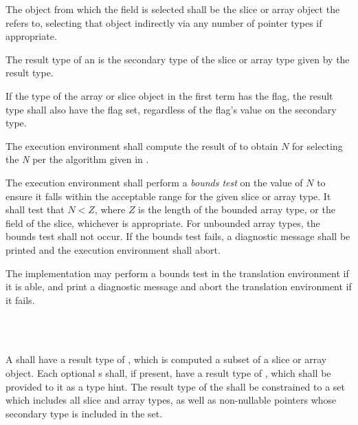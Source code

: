 
\specsubsubitem
The object from which the field is selected shall be the slice or array object
the  refers to, selecting that object indirectly
via any number of pointer types if appropriate.

\specsubsubitem
The result type of an  is the secondary type
of the slice or array type given by the  result
type.

\specsubsubitem
If the type of the array or slice object in the first term has the
 flag, the result type shall also have the 
flag set, regardless of the flag's value on the secondary type.

\specsubsubitem
The execution environment shall compute the result of
 to obtain $N$ for selecting the \textit{N} per the
algorithm given in .

\specsubsubitem
The execution environment shall perform a \textit{bounds test} on the value of
$N$ to ensure it falls within the acceptable range for the given slice or array
type. It shall test that $N < Z$, where $Z$ is the length of the bounded array
type, or the  field of the slice, whichever is appropriate.  For
unbounded array types, the bounds test shall not occur. If the bounds test
fails, a diagnostic message shall be printed and the execution environment
shall abort.

The implementation may perform a bounds test in the translation environment if
it is able, and print a diagnostic message and abort the translation environment
if it fails.


\begin{grammar}
 \\
	 \terminal{[}    \terminal{]} \\
\end{grammar}

\specsubsubitem
A  shall have a result type of
, which is computed a subset of a slice or array object.
Each optional s shall, if present, have a result type of
, which shall be provided to it as a type hint. The result type
of the  shall be constrained to a set which
includes all slice and array types, as well as non-nullable pointers whose
secondary type is included in the set.

